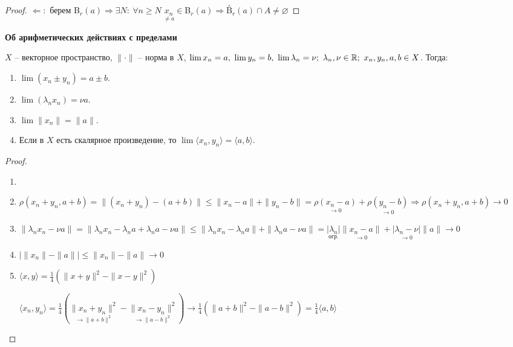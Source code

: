 \begin{proper}
\begin{enumerate}
\begin{proof}
            $\Leftarrow:$ берем B$_r(a)\Rightarrow\exists N:\ \forall n\geq N\ \underset{\neq a}{x_n}\in$B$_r(a)\Rightarrow\overset{\circ}{\text{B}}_r(a)\cap A\neq \varnothing$
        \end{proof}
    \end{enumerate}
\end{proper}

\begin{theorem}
    \textbf{Об арифметических действиях с пределами}

    $X$ – векторное пространство, $\|\cdot\|$ – норма в $X$, $\lim x_n=a,\ \lim y_n=b,\ \lim \lambda_n=\nu;\ \lambda_n,\nu\in \mathbb{R};\ x_n,y_n,a,b\in X$. Тогда:
    \begin{enumerate}
        \item $\lim (x_n \pm y_n) = a\pm b$.
        \item $\lim (\lambda_n x_n) = \nu a$.
        \item $\lim \|x_n\|=\|a\|$.
        \item Если в $X$ есть скалярное произведение, то $\lim \langle x_n, y_n\rangle =\langle a,b\rangle$.
    \end{enumerate}
    \begin{proof}
        \begin{enumerate}
            \item[]
            \item $\rho(x_n+y_n, a+b)=\|(x_n+y_n)-(a+b)\|\leq \|x_n-a\|+\|y_n-b\|=\underset{\rightarrow 0}{\rho(x_n-a)}+\underset{\rightarrow 0}{\rho(y_n-b)}\Rightarrow \rho(x_n+y_n, a+b)\rightarrow 0$
            \item $\|\lambda_nx_n-\nu a\|=\|\lambda_nx_n-\lambda_na+\lambda_na-\nu a\|\leq \|\lambda_nx_n-\lambda_n a\|+\|\lambda_n a-\nu a\|=\underset{\text{огр.}}{|\lambda_n|}\underset{\rightarrow 0}{\|x_n-a\|}+\underset{\rightarrow 0}{|\lambda_n-\nu|}\|a\|\rightarrow 0$
            \item $|\|x_n\|-\|a\||\leq\|x_n\|-\|a\|\rightarrow0$
            \item $\langle x,y\rangle=\frac{1}{4}(\|x+y\|^2-\|x-y\|^2)$

            $\langle x_n,y_n\rangle=\frac{1}{4}(\underset{\rightarrow\|a+b\|^2}{\|x_n+y_n\|^2}-\underset{\rightarrow\|a-b\|^2}{\|x_n-y_n\|^2})\rightarrow \frac{1}{4}(\|a+b\|^2-\|a-b\|^2)=\frac{1}{4}\langle a,b\rangle$
        \end{enumerate}
    \end{proof}
\end{theorem}
